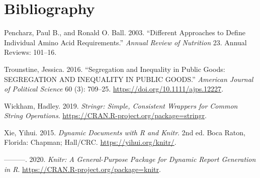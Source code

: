 \documentclass[]{article}
\begin{document}
\hypertarget{bibliography}{%
\section*{Bibliography}\label{bibliography}}

\hypertarget{refs}{}
\leavevmode\hypertarget{ref-PencharzPaulB.2003Datd}{}%
Pencharz, Paul B., and Ronald O. Ball. 2003. ``Different Approaches to
Define Individual Amino Acid Requirements.'' \emph{Annual Review of
Nutrition} 23. Annual Reviews: 101--16.

\leavevmode\hypertarget{ref-trounstine_segregation_2016}{}%
Trounstine, Jessica. 2016. ``Segregation and Inequality in Public Goods:
SEGREGATION AND INEQUALITY IN PUBLIC GOODS.'' \emph{American Journal of
Political Science} 60 (3): 709--25.
\url{https://doi.org/10.1111/ajps.12227}.

\leavevmode\hypertarget{ref-R-stringr}{}%
Wickham, Hadley. 2019. \emph{Stringr: Simple, Consistent Wrappers for
Common String Operations}.
\url{https://CRAN.R-project.org/package=stringr}.

\leavevmode\hypertarget{ref-knitr2015}{}%
Xie, Yihui. 2015. \emph{Dynamic Documents with R and Knitr}. 2nd ed.
Boca Raton, Florida: Chapman; Hall/CRC. \url{https://yihui.org/knitr/}.

\leavevmode\hypertarget{ref-R-knitr}{}%
---------. 2020. \emph{Knitr: A General-Purpose Package for Dynamic
Report Generation in R}. \url{https://CRAN.R-project.org/package=knitr}.
\end{document}

